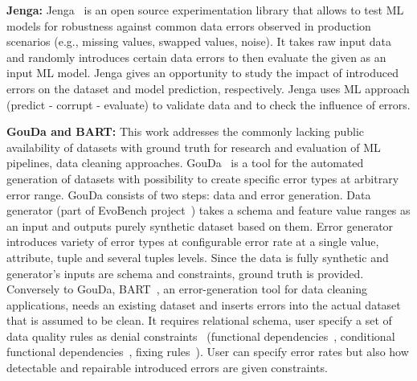 
\textbf{Jenga:} 
Jenga~\cite{jenga} is an open source experimentation library that allows to test ML models for robustness against common data errors observed in production scenarios (e.g., missing values, swapped values, noise).
It takes raw input data and randomly introduces certain data errors to then evaluate the given as an input ML model.
Jenga gives an opportunity to study the impact of introduced errors on the dataset and model prediction, respectively.
Jenga uses ML approach (predict - corrupt - evaluate) to validate data and to check the influence of errors.

\textbf{GouDa and BART:} 
This work addresses the commonly lacking public availability of datasets with ground truth for research and evaluation of ML pipelines, data cleaning approaches. 
GouDa~\cite{RestatGCS2022} is a tool for the automated generation of datasets with possibility to create specific error types at arbitrary error range.
GouDa consists of two steps: data and error generation.
Data generator (part of EvoBench project~\cite{evobench}) takes a schema and feature value ranges as an input and outputs purely synthetic dataset based on them. 
Error generator introduces variety of error types at configurable error rate at a single value, attribute, tuple and several tuples levels.
Since the data is fully synthetic and generator's inputs are schema and constraints, ground truth is provided. 
Conversely to GouDa, BART~\cite{bart}, an error-generation tool for data cleaning applications, needs an existing dataset and inserts errors into the actual dataset that is assumed to be clean. It requires relational schema, user specify
a set of data quality rules as denial constraints~\cite{denialconst} (functional dependencies~\cite{BohannonFGJK2007,  QahtanTOCS2020}, conditional functional dependencies~\cite{FanGJK2008}, fixing rules~\cite{fixingrules}). 
User can specify error rates but also how detectable and repairable introduced errors are given constraints.

